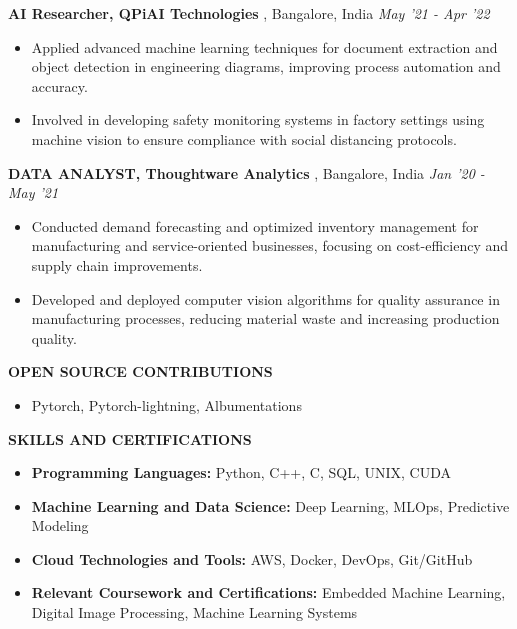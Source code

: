 \documentclass[10pt,a4]{article}
\begin{document}
{\begin{flushleft}
    \textbf{\large AI Researcher, QPiAI Technologies },  Bangalore, India \hfill \textit{\large May '21 - Apr '22}	\\
    \begin{itemize}
          
        \item \large Applied advanced machine learning techniques for document extraction and object detection in engineering diagrams, improving process automation and accuracy.
        \item \large Involved in developing safety monitoring systems in factory settings using machine vision to ensure compliance with social distancing protocols.
    \end{itemize}		

    \textbf{\large DATA ANALYST, Thoughtware Analytics },  Bangalore, India \hfill \textit{\large Jan '20 - May '21}	\\		
    \begin{itemize}
          
        \item \large Conducted demand forecasting and optimized inventory management for manufacturing and service-oriented businesses, focusing on cost-efficiency and supply chain improvements.
        \item \large Developed and deployed computer vision algorithms for quality assurance in manufacturing processes, reducing material waste and increasing production quality.   
    \end{itemize}
    
\end{flushleft}

\begin{flushleft}
    \textbf{\large OPEN SOURCE CONTRIBUTIONS}
    \begin{itemize}
        \item \large Pytorch, Pytorch-lightning, Albumentations
    \end{itemize}
\end{flushleft}



\begin{flushleft}
    {\Large \textbf {SKILLS AND CERTIFICATIONS}}
    
        \vspace{1mm}
        \begin{itemize}
            \item \large \textbf{Programming Languages:} Python, C++, C, SQL, UNIX, CUDA \\
            \item \large \textbf{Machine Learning and Data Science:} Deep Learning, MLOps, Predictive Modeling   \\
            \item \large \textbf{Cloud Technologies and Tools:} AWS, Docker, DevOps, Git/GitHub \\
            \item \large \textbf{Relevant Coursework and Certifications:} Embedded Machine Learning, Digital Image Processing, Machine Learning Systems \\
        

\end{itemize}
\end{flushleft}}
\end{document}
